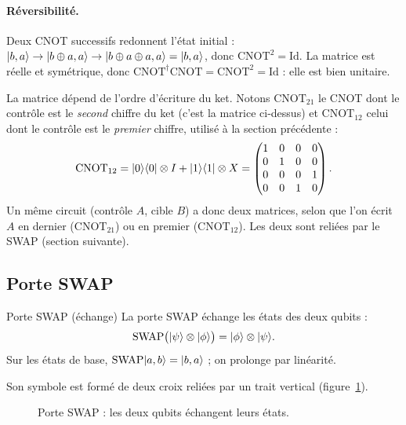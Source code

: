 \paragraph{Réversibilité.} Deux CNOT successifs redonnent l'état initial :
$|b,a\rangle\to|b\oplus a,a\rangle\to|b\oplus a\oplus a,a\rangle=|b,a\rangle$, donc
$\mathrm{CNOT}^2=\mathrm{Id}$. La matrice est réelle et symétrique, donc
$\mathrm{CNOT}^\dagger\mathrm{CNOT}=\mathrm{CNOT}^2=\mathrm{Id}$ : elle est bien unitaire.

\begin{remarque}
La matrice dépend de l'ordre d'écriture du ket. Notons $\mathrm{CNOT}_{21}$ le CNOT dont le
contrôle est le \emph{second} chiffre du ket (c'est la matrice ci-dessus) et
$\mathrm{CNOT}_{12}$ celui dont le contrôle est le \emph{premier} chiffre, utilisé à la
section précédente :
\[
  \mathrm{CNOT}_{12}=|0\rangle\langle 0|\otimes I+|1\rangle\langle 1|\otimes X
  =\begin{pmatrix}1&0&0&0\\0&1&0&0\\0&0&0&1\\0&0&1&0\end{pmatrix}.
\]
Un même circuit (contrôle $A$, cible $B$) a donc deux matrices, selon que l'on écrit
$A$ en dernier ($\mathrm{CNOT}_{21}$) ou en premier ($\mathrm{CNOT}_{12}$). Les deux sont
reliées par le SWAP (section suivante).
\end{remarque}

\subsection{Porte SWAP}\label{sec:swap}

\begin{definition}{Porte SWAP (échange)}
La porte SWAP échange les états des deux qubits :
\[
  \mathrm{SWAP}\big(|\psi\rangle\otimes|\phi\rangle\big)=|\phi\rangle\otimes|\psi\rangle.
\]
Sur les états de base, $\mathrm{SWAP}|a,b\rangle=|b,a\rangle$ ; on prolonge par linéarité.
\end{definition}

Son symbole est formé de deux croix reliées par un trait vertical
(figure~\ref{fig:swap}).

\begin{figure}[!ht]
\centering
{}
\caption{Porte SWAP : les deux qubits échangent leurs états.}
\label{fig:swap}
\end{figure}

